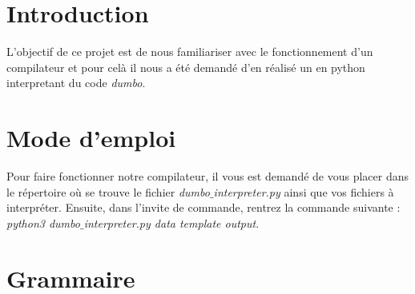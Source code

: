 \documentclass[a4paper, 12pt]{article}
\begin{document}
\tableofcontents

\newpage

\section{Introduction}

L'objectif de ce projet est de nous familiariser avec le fonctionnement d'un compilateur et pour celà il nous a été demandé d'en réalisé un en python interpretant du code \textit{dumbo}.

\section{Mode d'emploi}

Pour faire fonctionner notre compilateur, il vous est demandé de vous placer dans le répertoire où se trouve le fichier \textit{dumbo$\_$interpreter.py} ainsi que vos fichiers à interpréter. Ensuite, dans l'invite de commande, rentrez la commande suivante : \textit{python3 dumbo$\_$interpreter.py data template output}.

\section{Grammaire}
\end{document}
